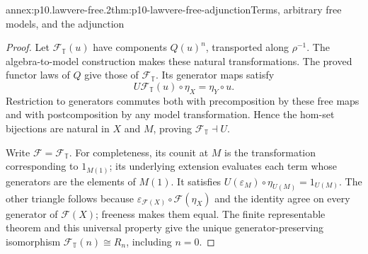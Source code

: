\begin{annexitem}{annex:p10.lawvere-free.2}{thm:p10-lawvere-free-adjunction}{Terms, arbitrary free models, and the adjunction}
\begin{proof}
Let \(\mathcal F_{\mathbb T}(u)\) have components \(Q(u)^n\), transported
along \(\rho^{-1}\). The algebra-to-model construction makes these
natural transformations. The proved functor laws of \(Q\) give those
of \(\mathcal F_{\mathbb T}\).
Its generator maps satisfy
\[
 U\mathcal F_{\mathbb T}(u)\circ\eta_X=\eta_Y\circ u.
\]
Restriction to generators commutes both with precomposition by these
free maps and with postcomposition by any model transformation.
Hence the hom-set bijections are natural in \(X\) and \(M\), proving
\(\mathcal F_{\mathbb T}\dashv U\).

Write \(\mathcal F=\mathcal F_{\mathbb T}\).
For completeness, its counit at \(M\) is the transformation
corresponding to \(1_{M(1)}\); its underlying extension evaluates
each term whose generators are the elements of \(M(1)\).
It satisfies \(U(\varepsilon_M)\circ\eta_{U(M)}=1_{U(M)}\).
The other triangle follows because
\(\varepsilon_{\mathcal F(X)}\circ\mathcal F(\eta_X)\) and the identity
agree on every generator of \(\mathcal F(X)\); freeness makes them equal.
The finite representable theorem and this universal property give
the unique generator-preserving isomorphism
\(\mathcal F_{\mathbb T}(n)\cong R_n\), including \(n=0\).
\end{proof}
\end{annexitem}

